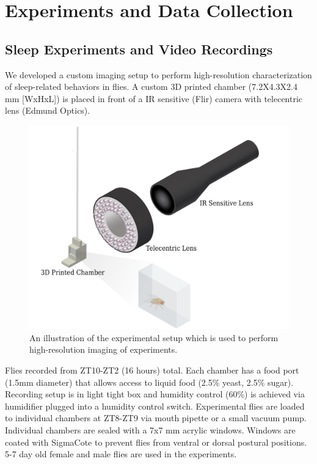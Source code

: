 \chapter{Experiments and Data Collection}\label{chapter:expt-data-collection}

\section{Sleep Experiments and Video Recordings}
We developed a custom imaging setup to perform high-resolution characterization of sleep-related behaviors in flies.
A custom 3D printed chamber (7.2X4.3X2.4 mm [WxHxL]) is placed in front of a IR sensitive (Flir) camera with telecentric lens (Edmund Optics).

\begin{figure}[ht!]
	\centering
	\includegraphics[width=0.75\linewidth]{figures/ExperimentalSetup.pdf}
	\caption[An illustration of the experimental setup which is used to perform high-resolution imaging of experiments.]{An illustration of the experimental setup which is used to perform high-resolution imaging of experiments.}
\end{figure}

Flies recorded from ZT10-ZT2 (16 hours) total.
Each chamber has a food port (1.5mm diameter) that allows access to liquid food (2.5\% yeast, 2.5\% sugar).
Recording setup is in light tight box and humidity control (60\%) is achieved via humidifier plugged into a humidity control switch.
Experimental flies are loaded to individual chambers at ZT8-ZT9 via mouth pipette or a small vacuum pump.
Individual chambers are sealed with a 7x7 mm acrylic windows.
Windows are coated with SigmaCote to prevent flies from ventral or dorsal postural positions.
5-7 day old female and male flies are used in the experiments.

